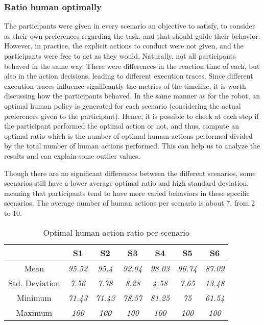 \subsubsection*{Ratio human optimally}
The participants were given in every scenario an objective to satisfy, to consider as their own preferences regarding the task, and that should guide their behavior. However, in practice, the explicit actions to conduct were not given, and the participants were free to act as they would. Naturally, not all participants behaved in the same way. There were differences in the reaction time of each, but also in the action decisions, leading to different execution traces. Since different execution traces influence significantly the metrics of the timeline, it is worth discussing how the participants behaved.
In the same manner as for the robot, an optimal human policy is generated for each scenario (considering the actual preferences given to the participant). Hence, it is possible to check at each step if the participant performed the optimal action or not, and thus, compute an optimal ratio which is the number of optimal human actions performed divided by the total number of human actions performed. This can help us to analyze the results and can explain some outlier values. 

Though there are no significant differences between the different scenarios, some scenarios still have a lower average optimal ratio and high standard deviation, meaning that participants tend to have more varied behaviors in these specific scenarios. 
The average number of human actions per scenario is about 7, from 2 to 10. 

\begin{table}[h]
    \center
    \begin{tabular}{c|c|c|c|c|c|c|}
    \cline{2-7}
    \textbf{}                            & S1             & S2             & S3             & S4             & S5            & S6             \\ \hline
    \multicolumn{1}{|c|}{Mean}           & \textit{95.52} & \textit{95.4} & \textit{92.04} & \textit{98.03} & \textit{96.74} & \textit{87.09} \\ \hline
    \multicolumn{1}{|c|}{Std. Deviation} & \textit{7.56}  & \textit{7.78}  & \textit{8.28}  & \textit{4.58}  & \textit{7.65} & \textit{13.48} \\ \hline
    \multicolumn{1}{|c|}{Minimum}        & \textit{71.43} & \textit{71.43} & \textit{78.57} & \textit{81.25} & \textit{75}   & \textit{61.54} \\ \hline
    \multicolumn{1}{|c|}{Maximum}        & \textit{100}   & \textit{100}   & \textit{100}   & \textit{100}   & \textit{100}  & \textit{100}   \\ \hline
    \end{tabular}
    \caption{Optimal human action ratio per scenario}
    \label{tab:optimal_human_ratio}
    \end{table}



